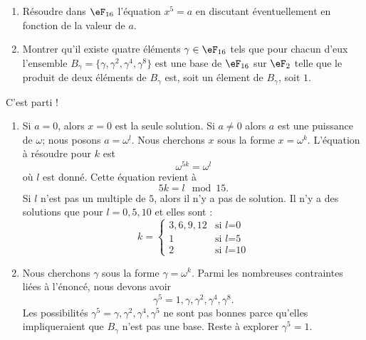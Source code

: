 \begin{example}
	\begin{enumerate}
		\item
		      Résoudre dans \( \eF_{16}\) l'équation \( x^5=a\) en discutant éventuellement en fonction de la valeur de \( a\).
		\item
		      Montrer qu'il existe quatre éléments \( \gamma\in\eF_{16}\) tels que pour chacun d'eux l'ensemble \( B_{\gamma}=\{ \gamma,\gamma^2,\gamma^4,\gamma^8 \}\) est une base de \( \eF_{16}\) sur \( \eF_2\) telle que le produit de deux éléments de \( B_{\gamma}\) est, soit un élement de \( B_{\gamma}\), soit \( 1\).
	\end{enumerate}

	C'est parti !
	\begin{enumerate}
		\item
		      Si \( a=0\), alors \( x=0\) est la seule solution. Si \( a\neq 0 \) alors \( a\) est une puissance de \( \omega\); nous posons \( a=\omega^l\). Nous cherchons \( x\) sous la forme \( x=\omega^k\). L'équation à résoudre pour \( k\) est
		      \begin{equation}
			      \omega^{5k}=\omega^l
		      \end{equation}
		      où \( l\) est donné. Cette équation revient à
		      \begin{equation}
			      5k=l\mod 15.
		      \end{equation}
		      Si \( l\) n'est pas un multiple de \( 5\), alors il n'y a pas de solution. Il n'y a des solutions que pour \( l=0,5,10\) et elles sont :
		      \begin{equation}
			      k=\begin{cases}
				      3,6,9,12 & \text{si } l\text{=0}  \\
				      1        & \text{si } l\text{=5}  \\
				      2        & \text{si } l\text{=10}
			      \end{cases}
		      \end{equation}
		\item
		      Nous cherchons \( \gamma\) sous la forme \( \gamma=\omega^k\). Parmi les nombreuses contraintes liées à l'énoncé, nous devons avoir
		      \begin{equation}
			      \gamma^5=1,\gamma,\gamma^2,\gamma^4,\gamma^8.
		      \end{equation}
		      Les possibilités \( \gamma^5=\gamma,\gamma^2,\gamma^4,\gamma^5\) ne sont pas bonnes parce qu'elles impliqueraient que \( B_{\gamma}\) n'est pas une base. Reste à explorer \( \gamma^5=1\).


\end{enumerate}
\end{example}
